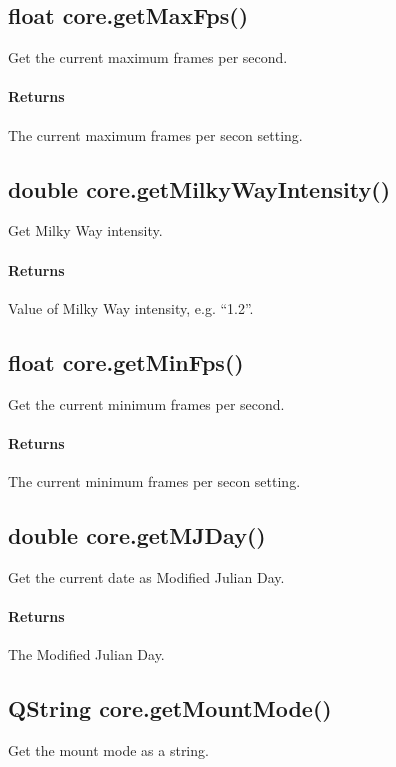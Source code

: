 \subsection{float core.getMaxFps()}
\label{sec:ScriptingAPI:core:getMaxFps}
Get the current maximum frames per second.

\paragraph{Returns}
The current maximum frames per secon setting.

\subsection{double core.getMilkyWayIntensity()}
\label{sec:ScriptingAPI:core:getMilkyWayIntensity}
Get Milky Way intensity.

\paragraph{Returns}
Value of Milky Way intensity, e.g. ``1.2''.

\subsection{float core.getMinFps()}
\label{sec:ScriptingAPI:core:getMinFps}
Get the current minimum frames per second.

\paragraph{Returns}
The current minimum frames per secon setting.

\subsection{double core.getMJDay()}
\label{sec:ScriptingAPI:core:getMJDay}
Get the current date as Modified Julian Day.

\paragraph{Returns}
The Modified Julian Day.

\subsection{QString core.getMountMode()}
\label{sec:ScriptingAPI:core:getMountMode}
Get the mount mode as a string.

